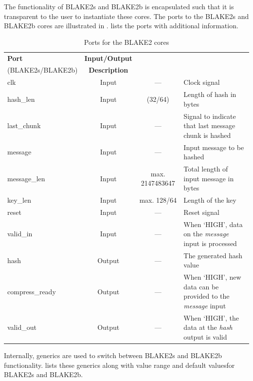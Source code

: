 \documentclass[%
	a4paper,
]
{article}
\begin{document}
The functionality of BLAKE2s and BLAKE2b is encapsulated such that it is
transparent to the user to instantiate these cores. The ports to the
BLAKE2s and BLAKE2b cores are illustrated in .
 lists the ports with additional information.

\begin{table}[htp]

	\centering
	\caption{Ports for the BLAKE2 cores}	
	\label{tbl:blake2-ports}
	\renewcommand{\arraystretch}{1.5}
	\begin{tabular}{l|c|c|m{3cm}}


	\hline
	\textbf{Port}
	& \textbf{Input/Output}
	&	\begin{minipage}[c]{3cm}%
				\textbf{Default value} \\
				(BLAKE2s/BLAKE2b)%
			\end{minipage}%
	& \textbf{Description}
	\\\hline

	clk
	& Input
	& ---
	& Clock signal
	\\\hline

	hash_len
	& Input
	& (32/64)
	&	Length of hash in bytes
	\\\hline

	last_chunk
	& Input
	& ---
	&	Signal to indicate that last message chunk is hashed%
	\\\hline

	message
	& Input
	& ---
	&	Input message to be hashed
	\\\hline

	message_len
	& Input
	& max. 2147483647
	& Total length of input message in bytes
	\\\hline

	key_len
	& Input
	& max. 128/64
	& Length of the key
	\\\hline

	reset
	& Input
	& ---
	& Reset signal
	\\\hline

	valid_in
	& Input
	& ---
	&	When `HIGH', data on the \emph{message} input is processed
	\\\hline

	hash
	& Output
	& ---
	&	The generated hash value
	\\\hline

	compress_ready
	& Output
	& ---
	&	When `HIGH', new data can be provided to the \emph{message} input
	\\\hline

	valid_out
	& Output
	& ---
	&	When `HIGH', the data at the \emph{hash} output is valid
	\\\hline

	\end{tabular}

\end{table}
%
%
Internally, generics are used to switch between BLAKE2s and BLAKE2b
functionality.  lists these generics along with
value range and default valuesfor BLAKE2s and BLAKE2b.
\end{document}

